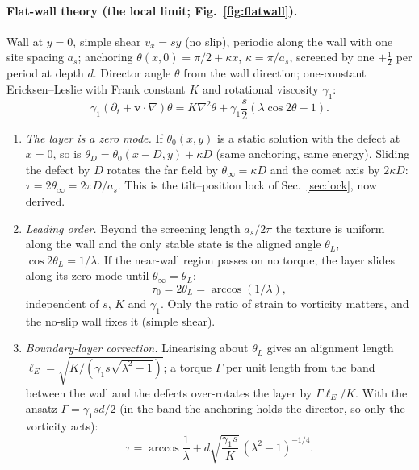\documentclass[11pt,a4paper]{article}
\newcommand{\half}{\tfrac12}
\begin{document}
\paragraph{Flat-wall theory (the local limit; Fig.~\ref{fig:flatwall}).} Wall at $y=0$, simple shear $v_x=sy$ (no slip), periodic along the wall with one site spacing $a_s$;
anchoring $\theta(x,0)=\pi/2+\kappa x$, $\kappa=\pi/a_s$, screened by one $+\half$ per period at depth $d$. Director angle $\theta$ from the wall direction; one-constant Ericksen--Leslie with Frank constant $K$ and rotational viscosity $\gamma_1$:
\begin{equation}
\gamma_1(\partial_t+\mathbf v\cdot\nabla)\theta = K\nabla^2\theta+\gamma_1\frac{s}{2}\left(\lambda\cos2\theta-1\right).
\end{equation}
\begin{enumerate}
  \item \emph{The layer is a zero mode.} If $\theta_0(x,y)$ is a static solution with the defect at $x=0$, so is $\theta_D=\theta_0(x-D,y)+\kappa D$ (same anchoring, same energy). Sliding the
        defect by $D$ rotates the far field by $\theta_\infty=\kappa D$ and the comet axis by $2\kappa D$: $\tau=2\theta_\infty=2\pi D/a_s$. This is the tilt--position lock of Sec.~\ref{sec:lock}, now derived.
  \item \emph{Leading order.} Beyond the screening length $a_s/2\pi$ the texture is uniform along the wall and the only stable state is the aligned angle $\theta_L$, $\cos2\theta_L=1/\lambda$.
        If the near-wall region passes on no torque, the layer slides along its zero mode until $\theta_\infty=\theta_L$:
        \begin{equation}\tau_0=2\theta_L=\arccos(1/\lambda),\end{equation}
        independent of $s$, $K$ and $\gamma_1$. Only the ratio of strain to vorticity matters, and the no-slip wall fixes it (simple shear).
  \item \emph{Boundary-layer correction.} Linearising about $\theta_L$ gives an alignment length $\ell_E=\sqrt{K/(\gamma_1 s\sqrt{\lambda^2-1})}$; a torque $\Gamma$ per unit length from the
        band between the wall and the defects over-rotates the layer by $\Gamma\ell_E/K$. With the ansatz $\Gamma=\gamma_1 sd/2$ (in the band the anchoring holds the director, so only
        the vorticity acts):
        \begin{equation}\tau=\arccos\frac1\lambda+d\sqrt{\frac{\gamma_1 s}{K}}\,(\lambda^2-1)^{-1/4}.\label{eq:tilt}\end{equation}
\end{enumerate}
\end{document}
